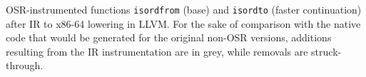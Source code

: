 \label{fig:isordx86-64} OSR-instrumented functions {\tt isordfrom} (base) and {\tt isordto} (faster continuation) after IR to x86-64 lowering in LLVM. For the sake of comparison with the native code that would be generated for the original non-OSR versions, additions resulting from the IR instrumentation are in grey, while removals are struck-through.